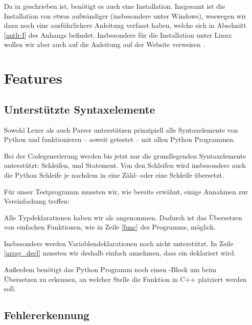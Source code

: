 Da  in  geschrieben ist, benötigt es auch eine  Installation. Insgesamt ist die Installation von  etwas aufwändiger (insbesondere unter Windows), weswegen wir dazu noch eine ausführlichere Anleitung verfasst haben, welche sich in Abschnitt \ref{antlr:I} des Anhangs befindet. Insbesondere für die Installation unter Linux wollen wir aber auch auf die Anleitung auf der  Website verweisen \cite{antlr}.





\section{Features} \label{features}

\subsection{Unterstützte Syntaxelemente}

Sowohl Lexer als auch Parser unterstützen prinzipiell alle Syntaxelemente von Python und funktionieren -- soweit getestet -- mit allen Python Programmen. %

Bei der Codegenerierung werden bis jetzt nur die grundlegenden Syntaxelemente unterstützt: Schleifen,  und  Statement. Von den Schleifen wird insbesondere auch die Python  Schleife je nachdem in eine Zähl- oder eine  Schleife übersetzt.

Für unser Testprogramm mussten wir, wie bereits erwähnt, einige Annahmen zur Vereinfachung treffen:

Alle Typdeklarationen haben wir als  angenommen. Dadurch ist das Übersetzen von einfachen Funktionen, wie in Zeile \ref{func} des Programms, möglich.

Insbesondere werden Variablendeklarationen noch nicht unterstützt. In Zeile \ref{array_decl} mussten wir deshalb einfach annehmen, dass ein  deklariert wird.

Außerdem benötigt das Python Programm noch einen -Block um beim Übersetzen zu erkennen, an welcher Stelle die  Funktion in C++ platziert werden soll.

 

\subsection{Fehlererkennung}

